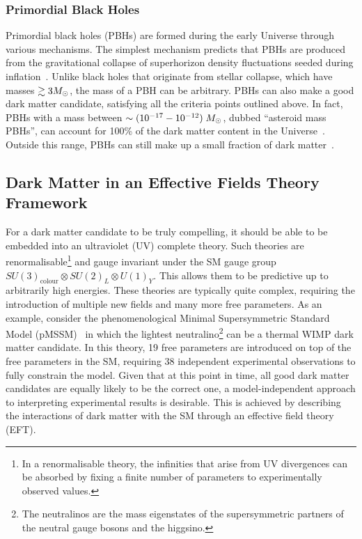 \subsubsection*{Primordial Black Holes}

Primordial black holes (PBHs) are formed during the early Universe through various mechanisms. The simplest mechanism predicts that PBHs are produced from the gravitational collapse of superhorizon density fluctuations seeded during inflation~\cite{Hawking:1971ei_apr_Gravitationallycollapsedobjects, Carr:1974nx_Blackholesearly,Carr:1975qj_Primordialblackhole}. 
Unlike black holes that originate from stellar collapse, which have masses $\gtrsim 3M_\odot$, the mass of a PBH can be arbitrary.  PBHs can also make a good dark matter candidate, satisfying all the criteria points outlined above. In fact, PBHs with a mass between $\sim (10^{-17} - 10^{-12})\;M_\odot$, dubbed ``asteroid mass PBHs'', can account for 100\% of the dark matter content in the Universe~\cite{Montero-Camacho:2019jte_aug_Revisitingconstraintsasteroidmass}. Outside this range, PBHs can still make up a small fraction of dark matter~\cite{Villanueva-Domingo:2021spv_may_Briefreviewprimordial}. 

\subsection{Dark Matter in an Effective Fields Theory Framework}
\label{subsec:DM_EFTs}

For a dark matter candidate to be truly compelling, it should be able to be embedded into an ultraviolet (UV) complete theory. Such theories are renormalisable\footnote{In a renormalisable theory, the infinities that arise from UV divergences can be absorbed by fixing a finite number of parameters to experimentally observed values.} and gauge invariant under the SM gauge group $SU(3)_\mathrm{colour}\otimes SU(2)_L\otimes U(1)_Y$. This allows them to be predictive up to arbitrarily high energies. These theories are typically quite complex, requiring the introduction of multiple new fields and many more free parameters. As an example, consider the phenomenological Minimal Supersymmetric Standard Model (pMSSM)~\cite{Villanueva-Domingo:2021spv_may_Briefreviewprimordial} in which the lightest neutralino\footnote{The neutralinos are the mass eigenstates of the supersymmetric partners of the neutral gauge bosons and the higgsino.} can be a thermal WIMP dark matter candidate. In this theory, 19 free parameters are introduced on top of the free parameters in the SM, requiring 38 independent experimental observations to fully constrain the model. Given that at this point in time, all good dark matter candidates are equally likely to be the correct one, a model-independent approach to interpreting experimental results is desirable. This is achieved by describing the interactions of dark matter with the SM through an effective field theory (EFT).

